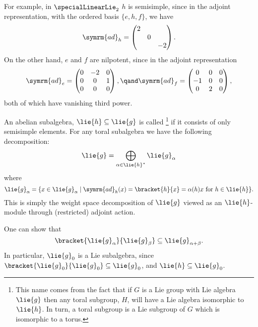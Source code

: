 \documentclass[fleqn]{NotesClass}
\newcommand{\ad}{\symrm{ad}}
\begin{document}
    For example, in \(\specialLinearLie_2\) \(h\) is semisimple, since in the adjoint representation, with the ordered basis \(\{e, h, f\}\), we have
    \begin{equation}
        \ad_h = 
        \begin{pmatrix}
            2\\
            & 0\\
            && -2
        \end{pmatrix}
        .
    \end{equation}
    On the other hand, \(e\) and \(f\) are nilpotent, since in the adjoint representation
    \begin{equation}
        \ad_e =
        \begin{pmatrix}
            0 & -2 & 0\\
            0 & 0 & 1\\
            0 & 0 & 0
        \end{pmatrix}
        , \qand \ad_f =
        \begin{pmatrix}
            0 & 0 & 0\\
            -1 & 0 & 0\\
            0 & 2 & 0
        \end{pmatrix}
        ,
    \end{equation}
    both of which have vanishing third power.
    
    An abelian subalgebra, \(\lie{h} \subseteq \lie{g}\) is called \footnote{This name comes from the fact that if \(G\) is a Lie group with Lie algebra \(\lie{g}\) then any toral subgroup, \(H\), will have a Lie algebra isomorphic to \(\lie{h}\). In turn, a toral subgroup is a Lie subgroup of \(G\) which is isomorphic to a torus.} if it consists of only semisimple elements.
    For any toral subalgebra we have the following decomposition:
    \begin{equation}
        \lie{g} = \bigoplus_{\alpha \in \lie{h}^*} \lie{g}_\alpha
    \end{equation}
    where
    \begin{equation}
        \lie{g}_\alpha = \{x \in \lie{g}_\alpha \mid \ad_h(x) = \bracket{h}{x} = \alpha(h)x \text{ for } h \in \lie{h}\}.
    \end{equation}
    This is simply the weight space decomposition of \(\lie{g}\) viewed as an \(\lie{h}\)-module through (restricted) adjoint action.
    
    One can show that
    \begin{equation}
        \bracket{\lie{g}_\alpha}{\lie{g}_\beta} \subseteq \lie{g}_{\alpha + \beta}.
    \end{equation}
    In particular, \(\lie{g}_0\) is a Lie subalgebra, since \(\bracket{\lie{g}_0}{\lie{g}_0} \subseteq \lie{g}_0\), and \(\lie{h} \subseteq \lie{g}_0\).
    
\end{document}
